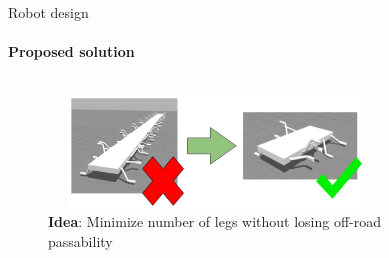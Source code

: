 \documentclass[aspectratio=169,xcolor=table]{beamer}
\begin{document}
\begin{frame}[t]{Robot design}
    \framesubtitle{Proposed solution}
    \begin{columns}[T,onlytextwidth]
        \begin{column}{0.49\textwidth}
            \begin{figure}[H]
                \centering\includegraphics[height=3cm,width=1\textwidth,keepaspectratio]{optimization_idea.png}
                \caption*{\textbf{Idea}: Minimize number of legs without losing off-road passability}
                \label{fig{optimization_idea.png}}
            \end{figure}
        \end{column}
        \begin{column}{0.49\textwidth}
            \vspace{-2cm}
            \begin{figure}[H]
                \centering
\end{figure}
\end{column}
\end{columns}
\end{frame}
\end{document}
